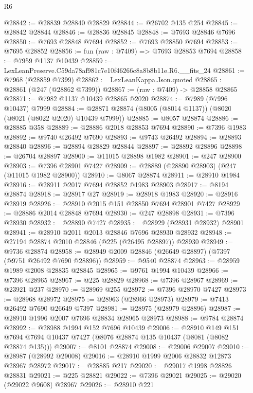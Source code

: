 \begin{lexlean}{R6}
\begin{coremodule}
@28842 := @28839 @28840 @28829
@28844 := @26702 @135 @254
@28845 := @28842 @28844
@28846 := @28836 @28845
@28848 := @7693 @28846 @7696
@28850 := @7693 @28848 @7694
@28852 := @7693 @28850 @7694
@28853 := @7695 @28852
@28856 := fun (raw : @7409) => @7693 @28853 @7694
@28858 := @7959 @1137 @10439
@28859 := LexLeanPreserve.C59da78af981c7e10f46266c8a8b8b11e.R6.__fits_24
@28861 := @7968 (@28859 @7399)
@28862 := LexLeanKappa.Json.quoted
@28865 := @28861 (@247 (@28862 @7399))
@28867 := (raw : @7409) -> @28858 @28865
@28871 := @7982 @1137 @10439 @28865 @2020
@28874 := @7989 (@7996 @10437) @7999
@28884 := @28871 @28874 (@8005 (@8014 @1137)) (@8020 (@8021 (@8022 @2020) @10439 @7999))
@28885 := @8057 @28874
@28886 := @28885 @358
@28889 := @28886 @2018 @28853 @7694
@28890 := @7396 @1983
@28892 := @9740 @26492 @7690
@28893 := @9743 @26492
@28894 := @28893 @28840
@28896 := @28894 @28829 @28844
@28897 := @28892 @28896
@28898 := @26704 @28897
@28900 := @11015 @28898 @1982
@28901 := @247 @28900
@28903 := @7396 @28901 @7427
@28909 := @28889 (@28890 @28903) (@247 (@11015 @1982 @28900))
@28910 := @8067 @28874
@28911 := @28910 @1984
@28916 := @28911 @2017 @7694 @28852 @1983 @28903
@28917 := @8194 @28874
@28918 := @28917 @27
@28919 := @28918 @1983
@28920 := @28916 @28919
@28926 := @28910 @2015 @151 @28850 @7694 @28901 @7427
@28929 := @28886 @2014 @28848 @7694
@28930 := @247 @28898
@28931 := @7396 @28930
@28932 := @28890 @7427
@28935 := @28929 (@28931 @28932) @28901
@28941 := @28910 @2011 @2013 @28846 @7696 @28930 @28932
@28948 := @27194 @28874 @2010 @28846 (@225 (@26495 @28897)) @28930
@28949 := @9736 @28874
@28958 := @28949 @2009 @28846 (@26649 @28897) (@7397 (@9751 @26492 @7690 @28896))
@28959 := @9540 @28874
@28963 := @28959 @1989 @2008 @28835 @28845
@28965 := @9761 @1994 @10439
@28966 := @7396 @28965
@28967 := @225 @28829
@28968 := @7396 @28967
@28969 := @23921 @237
@28970 := @28969 @255
@28972 := @7396 @28970 @7427
@28973 := @28968 @28972
@28975 := @28963 (@28966 @28973)
@28979 := @7413 @26492 @7690 @26649 @7397
@28981 := @28975 (@28979 @28896)
@28987 := @28910 @1996 @2007 @7696 @28834 @28965 @28973
@28988 := @9784 @28874
@28992 := @28988 @1994 @152 @7696 @10439
@29006 := @28910
    @149
    @151
    @7694
    @7694
    @10437
    @7427
    (@8076 @28874 @135 @10437 (@8081 (@8082 @28874 @135)))
@29007 := @8101 @28874
@29008 := @29006 @29007
@29010 := @28987 (@28992 @29008)
@29016 := @28910 @1999 @2006 @28832 @12873 @28967 @28972
@29017 := @28885 @217
@29020 := @29017 @1998 @28826 @28831
@29021 := @225 @28821
@29022 := @7396 @29021
@29025 := @29020 (@29022 @9608) @28967
@29026 := @28910 @221

\end{coremodule}
\end{lexlean}
